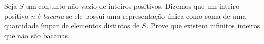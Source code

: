 Seja $S$ um conjunto não vazio de inteiros positivos. Dizemos que um inteiro positivo $n$ é \emph{bacana} se ele possui uma representação única como soma de uma quantidade ímpar de elementos distintos de $S$. Prove que existem infinitos inteiros que não são bacanas.
